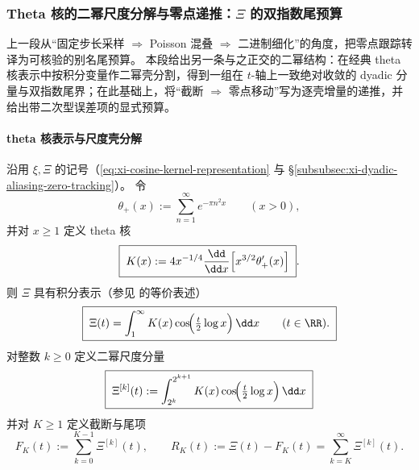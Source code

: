 \subsubsection{Theta 核的二幂尺度分解与零点递推：\texorpdfstring{$\Xi$}{Xi} 的双指数尾预算}\label{subsubsec:xi-theta-kernel-dyadic-scale-decomposition}
上一段从“固定步长采样 \(\Rightarrow\) Poisson 混叠 \(\Rightarrow\) 二进制细化”的角度，把零点跟踪转译为可核验的别名尾预算。
本段给出另一条与之正交的二幂结构：在经典 theta 核表示中按积分变量作二幂壳分割，得到一组在 \(t\)-轴上一致绝对收敛的 dyadic 分量与双指数尾界；在此基础上，将“截断 \(\Rightarrow\) 零点移动”写为逐壳增量的递推，并给出带二次型误差项的显式预算。

\paragraph{theta 核表示与尺度壳分解}
沿用 \(\xi,\Xi\) 的记号（\eqref{eq:xi-cosine-kernel-representation} 与 \S\ref{subsubsec:xi-dyadic-aliasing-zero-tracking}）。
令
\[
\theta_+(x):=\sum_{n=1}^{\infty}e^{-\pi n^2 x}\qquad(x>0),
\]
并对 \(x\ge 1\) 定义 theta 核
\begin{equation}\label{eq:xi-theta-kernel-K-def}
\boxed{\;
K(x):=4x^{-1/4}\frac{\dd}{\dd x}\Bigl[x^{3/2}\theta_+'(x)\Bigr]\; }.
\end{equation}
则 \(\Xi\) 具有积分表示（参见 \cite{Titchmarsh1986RiemannZeta} 的等价表述）
\begin{equation}\label{eq:xi-theta-kernel-integral-representation}
\boxed{\;
\Xi(t)=\int_{1}^{\infty}K(x)\cos\!\Bigl(\tfrac{t}{2}\log x\Bigr)\,\dd x\qquad(t\in\RR).\;}
\end{equation}
对整数 \(k\ge 0\) 定义二幂尺度分量
\begin{equation}\label{eq:xi-theta-kernel-dyadic-component}
\boxed{\;
\Xi^{[k]}(t):=\int_{2^k}^{2^{k+1}}K(x)\cos\!\Bigl(\tfrac{t}{2}\log x\Bigr)\,\dd x\;}
\end{equation}
并对 \(K\ge 1\) 定义截断与尾项
\[
F_K(t):=\sum_{k=0}^{K-1}\Xi^{[k]}(t),
\qquad
R_K(t):=\Xi(t)-F_K(t)=\sum_{k=K}^{\infty}\Xi^{[k]}(t).
\]

